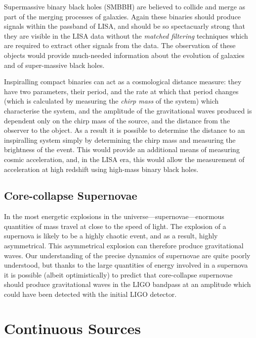 \documentclass{kentigern}
\begin{document}
Supermassive binary black holes (SMBBH) are believed to collide and
merge as part of the merging processes of galaxies. Again these
binaries should produce signals within the passband of LISA\cite{2012CQGra..29l4016A}, and
should be so spectacuarly strong that they are visible in the LISA
data without the \emph{matched filtering} techniques which are
required to extract other signals from the data\cite{2009LRR....12....2S}. The observation of
these objects would provide much-needed information about the
evolution of galaxies and of super-massive black holes.

Inspiralling compact binaries can act as a cosmological distance
measure: they have two parameters, their period, and the rate at which
that period changes (which is calculated by measuring the \emph{chirp
  mass} of the system) which characterise the system, and the
amplitude of the gravitational waves produced is dependent only on the
chirp mass of the source, and the distance from the observer to the
object. As a result it is possible to determine the distance to an
inspiralling system simply by determining the chirp mass and measuring
the brightness of the event. This would provide an additional means of
measuring cosmic acceleration, and, in the LISA era, this would allow
the measurement of acceleration at high redshift using high-mass
binary black holes.




\subsection{Core-collapse Supernovae}
\label{sec:sn}

In the most energetic explosions in the
universe---supernovae---enormous quantities of mass travel at close to
the speed of light. The explosion of a supernova is likely to be a
highly chaotic event, and as a result, highly asymmetrical. This
asymmetrical explosion can therefore produce gravitational waves. Our
understanding of the precise dynamics of supernovae are quite poorly
understood, but thanks to the large quantities of energy involved in a
supernova it is possible (albeit optimistically) to predict that
core-collapse supernovae should produce gravitational waves in the
LIGO bandpass at an amplitude which could have been detected with the
initial LIGO detector\cite{2009LRR....12....2S}.

\section{Continuous Sources}
\label{sec:continuous-sources}
\end{document}
